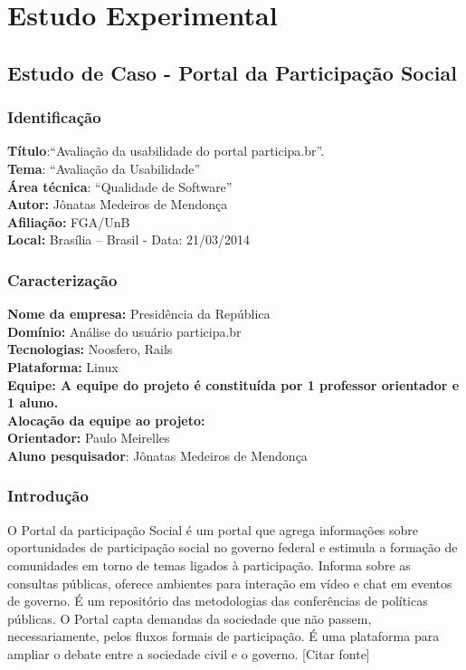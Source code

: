 \chapter{Estudo Experimental}

\section{Estudo de Caso - Portal da Participação Social}

\subsection{Identificação}

\textbf{Título}:“Avaliação da usabilidade do portal participa.br”.\\
\textbf{Tema}: “Avaliação da Usabilidade” \\
\textbf{Área técnica}: “Qualidade de Software” \\ 
\textbf{Autor:} Jônatas Medeiros de Mendonça  \\
\textbf{Afiliação:} FGA/UnB \\
\textbf{Local:} Brasília – Brasil - Data:  21/03/2014 \\

\subsection{Caracterização}

\textbf{Nome da empresa:} Presidência da República \\
\textbf{Domínio:} Análise do usuário participa.br \\
\textbf{Tecnologias:} Noosfero, Rails \\
\textbf{Plataforma:} Linux \\
\textbf{Equipe: A equipe do projeto é constituída por 1 professor orientador e 1 aluno.} \\
\textbf{Alocação da equipe ao projeto:} \\
\textbf{Orientador:} Paulo Meirelles\\
\textbf{Aluno pesquisador}: Jônatas Medeiros de Mendonça\\

\subsection{Introdução}

O Portal da participação Social é um portal que agrega informações sobre oportunidades de participação social no governo federal e estimula a formação de comunidades em torno de temas ligados à participação. Informa sobre as consultas públicas, oferece ambientes para interação em vídeo e chat em eventos de governo. É um repositório das metodologias das conferências de políticas públicas. O Portal capta demandas da sociedade que não passem, necessariamente, pelos fluxos formais de participação. É uma plataforma para ampliar o debate entre a sociedade civil e o governo. [Citar fonte]


